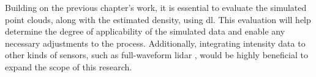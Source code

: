 
Building on the previous chapter's work, it is essential to evaluate the simulated point clouds, along with the estimated density, using \acrshort{dl}. This evaluation will help determine the degree of applicability of the simulated data and enable any necessary adjustments to the process. Additionally, integrating intensity data to other kinds of sensors, such as full-waveform \acrshort{lidar} \cite{tachella_real-time_2019}, would be highly beneficial to expand the scope of this research.
